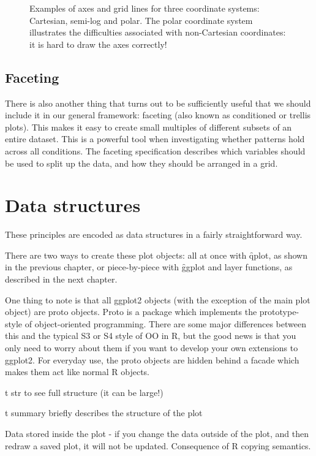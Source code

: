 \begin{figure}[htbp]
  \centering
  \caption{Examples of axes and grid lines for three coordinate systems: Cartesian, semi-log and polar. The polar coordinate system illustrates the difficulties associated with non-Cartesian coordinates: it is hard to draw the axes correctly!}
  \label{fig:coord}
\end{figure}

\subsection{Faceting}\label{sec:faceting}

There is also another thing that turns out to be sufficiently useful that we should include it in our general framework: faceting (also known as conditioned or trellis plots). This makes it easy to create small multiples of different subsets of an entire dataset. This is a powerful tool when investigating whether patterns hold across all conditions.  The faceting specification describes which variables should be used to split up the data, and how they should be arranged in a grid.

\section{Data structures}
\label{sec:data_structures}

These principles are encoded as data structures in a fairly straightforward way.

There are two ways to create these plot objects: all at once with \f{qplot}, as shown in the previous chapter, or piece-by-piece with \f{ggplot} and layer functions, as described in the next chapter.

One thing to note is that all ggplot2 objects (with the exception of the main plot object) are proto objects.  Proto is a package which implements the prototype-style of object-oriented programming.  There are some major differences between this and the typical S3 or S4 style of OO in R, but the good news is that you only need to worry about them if you want to develop your own extensions to ggplot2.  For everyday use, the proto objects are hidden behind a facade which makes them act like normal R objects.

{  t str} to see full structure (it can be large!)

{  t summary} briefly describes the structure of the plot

Data stored inside the plot - if you change the data outside of the plot, and then redraw a saved plot, it will not be updated.  Consequence of R copying semantics.

